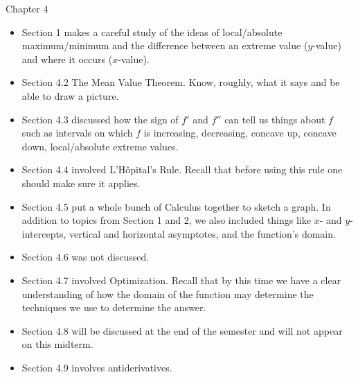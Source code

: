 \documentclass[11pt,fleqn]{article}
\begin{document}
Chapter 4\\
\begin{itemize}
	\item Section 1 makes a careful study of the ideas of local/absolute maximum/minimum and the difference between an extreme value ($y$-value) and where it occurs ($x$-value).
	\item Section 4.2 The Mean Value Theorem. Know, roughly, what it says and be able to draw a picture.
	\item Section 4.3 discussed how the sign of $f'$ and $f''$ can tell us things about $f$ such as intervals on which $f$ is increasing, decreasing, concave up, concave down, local/absolute extreme values.
	\item Section 4.4 involved L'H\^{o}pital's Rule. Recall that before using this rule one should make sure it applies.
	\item Section 4.5 put a whole bunch of Calculus together to sketch a graph. In addition to topics from Section 1 and 2, we also included things like $x$- and $y$-intercepts, vertical and horizontal asymptotes, and the function's domain.
	\item Section 4.6 was not discussed.
	\item Section 4.7 involved Optimization. Recall that by this time we have a clear  understanding of how the  domain of the function may determine the techniques we use to determine the answer. 
	\item Section 4.8 will be discussed at the end of the semester and will not appear on this midterm.
	\item Section 4.9 involves antiderivatives.
\end{itemize}
\end{document}
